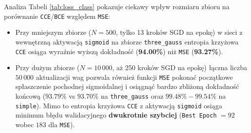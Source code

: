 \documentclass{article}
\begin{document}
\begin{table}[H]
\centering
\caption{Wpływ funkcji straty na skuteczność i szybkość zbieżności klasyfikacji dla architektury \texttt{[16, 8]} ($N = 10\,000$ oraz odniesienie do $N = 500$).}
\label{tab:loss_class}
\vspace{0.2cm}
\end{table}

Analiza Tabeli \ref{tab:loss_class} pokazuje ciekawy wpływ rozmiaru zbioru na porównanie \texttt{CCE}/\texttt{BCE} względem \texttt{MSE}:
\begin{itemize}
    \item Przy mniejszym zbiorze ($N = 500$, tylko 13 kroków SGD na epokę) w sieci z wewnętrzną aktywacją \texttt{sigmoid} na zbiorze \texttt{three\_gauss} entropia krzyżowa \texttt{CCE} osiąga wyraźnie wyższą dokładność (\textbf{94.00\%}) niż \texttt{MSE} (\textbf{93.27\%}).
    \item Przy dużym zbiorze ($N = 10\,000$, aż 250 kroków SGD na epokę) łączna liczba $50\,000$ aktualizacji wag pozwala również funkcji \texttt{MSE} pokonać początkowe spłaszczenie pochodnej sigmoidalnej i osiągnąć bardzo zbliżoną dokładność końcową ($93.79\%$ vs $93.70\%$ na \texttt{three\_gauss} oraz $99.48\% - 99.54\%$ na \texttt{simple}). Mimo to entropia krzyżowa \texttt{CCE} z aktywacją \texttt{sigmoid} osiąga minimum błędu walidacyjnego \textbf{dwukrotnie szybciej} (\texttt{Best Epoch} $= 92$ wobec $183$ dla \texttt{MSE}).
\end{itemize}
\end{document}
